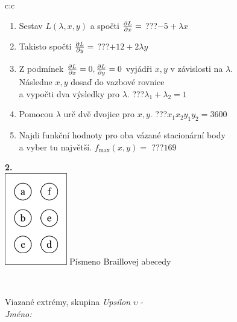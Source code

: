 \documentclass[10pt]{report}
\begin{document}
\begin{tabular}{c:c}
\begin{minipage}[c][104.5mm][t]{0.5\linewidth}
\begin{center}
\begin{minipage}{0.79\linewidth}
\begin{center}
\begin{varwidth}{\linewidth}
\begin{enumerate}
\item Sestav $L(\lambda,x,y)$ a spočti $\pdv{L}{x}=$\quad \dotfill\; ???\;\dotfill \quad $-5+\lambda x$
\item Takisto spočti $\pdv{L}{y}=$\quad \dotfill\; ???\;\dotfill \quad $+12+2\lambda y$
\item Z podmínek $\pdv{L}{x}=0 , \pdv{L}{y}=0$ vyjádři $x,y$ v závislosti na $\lambda$.\\ \phantom{xxxxxx}Následne $x,y$ dosaď do vazbové rovnice\\ \phantom{xxxxxx}a vypočti dva výsledky pro $\lambda$.\quad \dotfill\; ???\;\dotfill \quad $\lambda_1+\lambda_2=1$
\item Pomocou $\lambda$ urč dvě dvojice pro $x,y$.\quad \dotfill\; ???\;\dotfill \quad $x_1 x_2 y_1 y_2=3600$
\item Najdi funkční hodnoty pro oba vázané stacionární body\\ \phantom{xxxxxx}a vyber tu najvětší. $f_{\text{max}}(x,y)=$\quad \dotfill\; ???\;\dotfill \quad $169$
\end{enumerate}
\end{varwidth}
\end{center}
\end{minipage}
\begin{minipage}{0.20\linewidth}
\begin{center}
{\Huge\bfseries 2.} \\[2mm]
\includegraphics[height=40mm]{../images/braille.png}
{\small Písmeno Braillovej abecedy}
\end{center}
\end{minipage}
\end{center}
\end{minipage}
\\ \hdashline
\begin{minipage}[c][104.5mm][t]{0.5\linewidth}
\begin{center}
\vspace{7mm}
{\huge Viazané extrémy, skupina \textit{Upsilon $\upsilon$} -}\\[5mm]
\textit{Jméno:}\phantom{xxxxxxxxxxxxxxxxxxxxxxxxxxxxxxxxxxxxxxxxxxxxxxxxxxxxxxxxxxxxxxxxx}\\[5mm]

\end{center}
\end{minipage}
\end{tabular}
\end{document}
